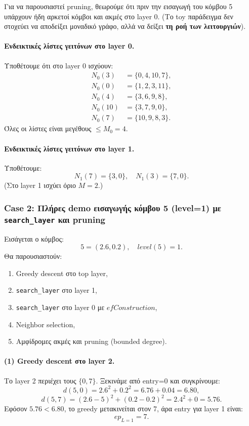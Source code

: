 \documentclass[12pt,a4paper]{article}
\begin{document}
Για να παρουσιαστεί pruning, θεωρούμε ότι πριν την εισαγωγή του κόμβου 5 υπάρχουν ήδη αρκετοί κόμβοι και ακμές στο layer 0.
(Το toy παράδειγμα δεν στοχεύει να αποδείξει μοναδικό γράφο, αλλά να δείξει \textbf{τη ροή των λειτουργιών}).

\paragraph{Ενδεικτικές λίστες γειτόνων στο layer 0.}
Υποθέτουμε ότι στο layer 0 ισχύουν:
\[
\begin{aligned}
N_0(3)&=\{0,4,10,7\},\\
N_0(0)&=\{1,2,3,11\},\\
N_0(4)&=\{3,6,9,8\},\\
N_0(10)&=\{3,7,9,0\},\\
N_0(7)&=\{10,9,8,3\}.
\end{aligned}
\]
Όλες οι λίστες είναι μεγέθους $\le M_0=4$.

\paragraph{Ενδεικτικές λίστες γειτόνων στο layer 1.}
Υποθέτουμε:
\[
N_1(7)=\{3,0\},\quad
N_1(3)=\{7,0\}.
\]
(Στο layer 1 ισχύει όριο $M=2$.)

\subsubsection{Case 2: Πλήρες demo εισαγωγής κόμβου 5 (level=1) με \texttt{search\_layer} και pruning}
\label{subsec:case_full_insert_5}

Εισάγεται ο κόμβος:
\[
5=(2.6,0.2),\quad level(5)=1.
\]
Θα παρουσιαστούν:
\begin{enumerate}
    \item Greedy descent στο top layer,
    \item \texttt{search\_layer} στο layer 1,
    \item \texttt{search\_layer} στο layer 0 με $efConstruction$,
    \item Neighbor selection,
    \item Αμφίδρομες ακμές και pruning (bounded degree).
\end{enumerate}

\paragraph{(1) Greedy descent στο layer 2.}
Το layer 2 περιέχει τους $\{0,7\}$. Ξεκινάμε από entry=0 και συγκρίνουμε:
\[
d(5,0)=2.6^2+0.2^2=6.76+0.04=6.80,
\]
\[
d(5,7)=(2.6-5)^2+(0.2-0.2)^2=2.4^2+0=5.76.
\]
Εφόσον $5.76 < 6.80$, το greedy μετακινείται στον 7, άρα entry για layer 1 είναι:
\[
ep_{L=1}=7.
\]
\end{document}

